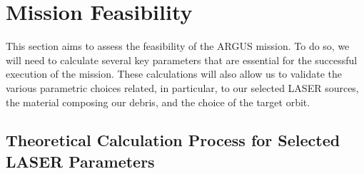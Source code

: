 \documentclass[11pt,a4paper]{article}
\newcommand{\todo}[1]{\textbf{[TO DO: #1]}}
\begin{document}




\newpage
\section{Mission Feasibility}
This section aims to assess the feasibility of the ARGUS mission. To do so, we will need to calculate several key parameters that are essential for the successful execution of the mission. These calculations will also allow us to validate the various parametric choices related, in particular, to our selected LASER sources, the material composing our debris, and the choice of the target orbit.

\subsection{Theoretical Calculation Process for Selected LASER Parameters}
\end{document}
